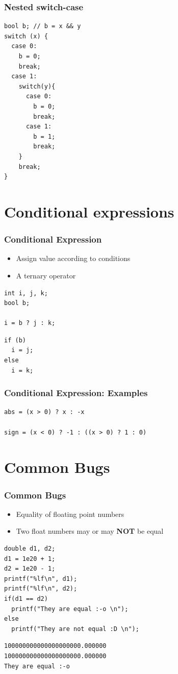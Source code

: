 \documentclass{../c-lecture}
\begin{document}
\begin{frame}[fragile]
  \frametitle{Nested switch-case}
  \scriptsize
  \begin{verbatim}
bool b; // b = x && y
switch (x) {
  case 0:
    b = 0;
    break;
  case 1:
    switch(y){
      case 0:
        b = 0;
        break;
      case 1:
        b = 1;
        break;
    }
    break;
}
  \end{verbatim}
\end{frame}

\section{Conditional expressions}

\begin{frame}[fragile]
  \frametitle{Conditional Expression}
  \begin{itemize}
    \item Assign value according to conditions
    \item A ternary operator
  \end{itemize}
  \begin{verbatim}
int i, j, k;
bool b;

i = b ? j : k;
  \end{verbatim}
  \begin{verbatim}
if (b)
  i = j;
else
  i = k;
  \end{verbatim}
\end{frame}

\begin{frame}[fragile]
  \frametitle{Conditional Expression: Examples}
  \begin{verbatim}
abs = (x > 0) ? x : -x

sign = (x < 0) ? -1 : ((x > 0) ? 1 : 0)
  \end{verbatim}
\end{frame}

\section{Common Bugs}

\begin{frame}[fragile]
  \frametitle{Common Bugs}
  \begin{itemize}
    \item Equality of floating point numbers
    \item
      Two float numbers may or may \textbf{\color{RubineRed} NOT} be equal
  \end{itemize}
  \scriptsize
  \begin{verbatim}
double d1, d2;
d1 = 1e20 + 1;
d2 = 1e20 - 1;
printf("%lf\n", d1);
printf("%lf\n", d2);
if(d1 == d2)
  printf("They are equal :-o \n");
else
  printf("They are not equal :D \n");
  \end{verbatim}
  \scriptsize
  \begin{verbatim}
100000000000000000000.000000
100000000000000000000.000000
They are equal :-o
  \end{verbatim}
\end{frame}
\end{document}
